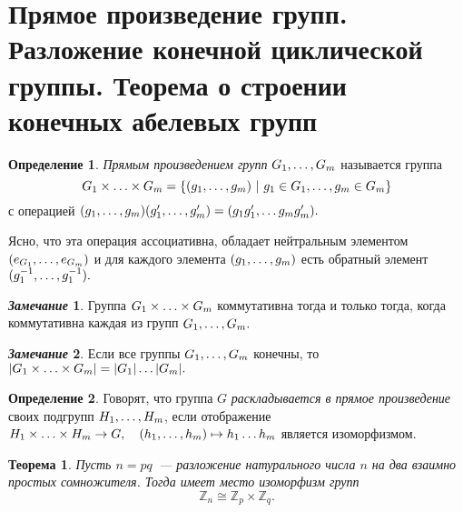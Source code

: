 \documentclass[a4paper, 14pt]{extarticle}
\newcommand{\n}{\par}
\newcommand{\integers}{\mathbb{Z}}
\theoremstyle{definition}
\newtheorem*{remark}{\textit{Замечание}}
\newtheorem{definition}{Определение}
\theoremstyle{plain}
\newtheorem*{theorem*}{Теорема}
\numberwithin{theorem}{section}
\numberwithin{definition}{section}
\numberwithin{statement}{section}
\numberwithin{lemma}{section}
\numberwithin{consequence}{section}
\begin{document}
	\section{Прямое произведение групп. Разложение конечной циклической группы. Теорема о строении конечных абелевых групп}
	\setcounter{definition}{0}
	\begin{definition}
		\textit{Прямым произведением групп} $G_1, \mathellipsis, G_m$ называется группа
		\begin{equation*}
			G_1 \times \mathellipsis \times G_m = \{(g_1, \mathellipsis, g_m) \ | \ g_1 \in G_1, \mathellipsis, g_m \in G_m\}
		\end{equation*}
		с операцией $(g_1, \mathellipsis, g_m)(g'_1, \mathellipsis, g'_m) = (g_1g'_1, \mathellipsis g_mg'_m).$ \n
		Ясно, что эта операция ассоциативна, обладает нейтральным элементом $(e_{G_1}, \mathellipsis, e_{G_m})$ и для каждого элемента $(g_1, \mathellipsis, g_m)$ есть обратный элемент $(g^{-1}_1, \mathellipsis, g^{-1}_1).$
	\end{definition}
	\begin{remark}
		Группа $G_1 \times \mathellipsis \times G_m$ коммутативна тогда и только тогда, когда коммутативна каждая из групп $G_1, \mathellipsis, G_m.$
	\end{remark}
	\begin{remark}
		Если все группы ${G_1, \mathellipsis, G_m}$ конечны, то ${|G_1 \times \mathellipsis \times G_m| = |G_1| \mathellipsis |G_m|.}$
	\end{remark}
	\begin{definition}
		Говорят, что группа $G$ \textit{раскладывается в прямое произведение} своих подгрупп ${H_1, \mathellipsis, H_m}$, если отображение
		${H_1 \times \mathellipsis \times H_m \rightarrow G, \quad (h_1, \mathellipsis, h_m) \mapsto h_1 \mathellipsis h_m}$ является изоморфизмом.
	\end{definition}
	\begin{theorem*}
		Пусть ${n = pq}$~--- разложение натурального числа $n$ на два взаимно простых сомножителя. Тогда имеет место изоморфизм групп
		\begin{equation*}
			\integers_n \cong \integers_p \times \integers_q.
		\end{equation*}
	\end{theorem*}
	\newpage
\end{document}
